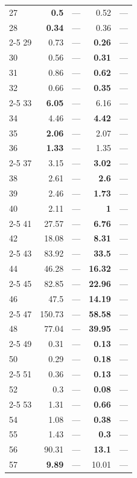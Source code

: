 \begin{longtable}{lr@{\hskip 4pt}l@{\hskip 12pt}r@{\hskip 4pt}l@{\hskip 12pt}}
27 & \textbf{0.5} & --- & 0.52 & --- \\
28 & \textbf{0.34} & --- & 0.36 & --- \\
\cmidrule{2-5}
29 & 0.73 & --- & \textbf{0.26} & --- \\
30 & 0.56 & --- & \textbf{0.31} & --- \\
31 & 0.86 & --- & \textbf{0.62} & --- \\
32 & 0.66 & --- & \textbf{0.35} & --- \\
\cmidrule{2-5}
33 & \textbf{6.05} & --- & 6.16 & --- \\
34 & 4.46 & --- & \textbf{4.42} & --- \\
35 & \textbf{2.06} & --- & 2.07 & --- \\
36 & \textbf{1.33} & --- & 1.35 & --- \\
\cmidrule{2-5}
37 & 3.15 & --- & \textbf{3.02} & --- \\
38 & 2.61 & --- & \textbf{2.6} & --- \\
39 & 2.46 & --- & \textbf{1.73} & --- \\
40 & 2.11 & --- & \textbf{1} & --- \\
\cmidrule{2-5}
41 & 27.57 & --- & \textbf{6.76} & --- \\
42 & 18.08 & --- & \textbf{8.31} & --- \\
\cmidrule{2-5}
43 & 83.92 & --- & \textbf{33.5} & --- \\
44 & 46.28 & --- & \textbf{16.32} & --- \\
\cmidrule{2-5}
45 & 82.85 & --- & \textbf{22.96} & --- \\
46 & 47.5 & --- & \textbf{14.19} & --- \\
\cmidrule{2-5}
47 & 150.73 & --- & \textbf{58.58} & --- \\
48 & 77.04 & --- & \textbf{39.95} & --- \\
\cmidrule{2-5}
49 & 0.31 & --- & \textbf{0.13} & --- \\
50 & 0.29 & --- & \textbf{0.18} & --- \\
\cmidrule{2-5}
51 & 0.36 & --- & \textbf{0.13} & --- \\
52 & 0.3 & --- & \textbf{0.08} & --- \\
\cmidrule{2-5}
53 & 1.31 & --- & \textbf{0.66} & --- \\
54 & 1.08 & --- & \textbf{0.38} & --- \\
\midrule
55 & 1.43 & --- & \textbf{0.3} & --- \\
56 & 90.31 & --- & \textbf{13.1} & --- \\
57 & \textbf{9.89} & --- & 10.01 & --- \\

\end{longtable}
